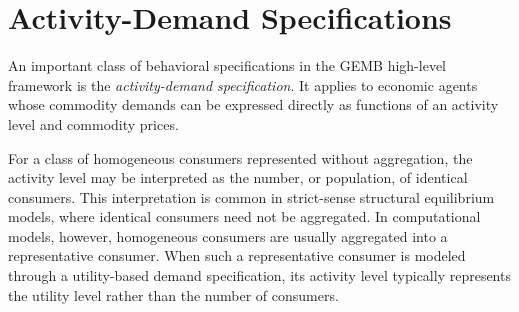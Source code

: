 \documentclass[
  letterpaper,
  DIV=11,
  numbers=noendperiod]{scrreprt}
\newenvironment{Shaded}{\begin{snugshade}}{\end{snugshade}}
\newcommand{\FloatTok}[1]{\textcolor[rgb]{0.68,0.00,0.00}{#1}}
\newcommand{\FunctionTok}[1]{\textcolor[rgb]{0.28,0.35,0.67}{#1}}
\newcommand{\NormalTok}[1]{\textcolor[rgb]{0.00,0.23,0.31}{#1}}
\newcommand{\OperatorTok}[1]{\textcolor[rgb]{0.37,0.37,0.37}{#1}}
\newcommand{\PreprocessorTok}[1]{\textcolor[rgb]{0.68,0.00,0.00}{#1}}
\newcommand{\StringTok}[1]{\textcolor[rgb]{0.13,0.47,0.30}{#1}}
\begin{document}
%

\section{Activity-Demand
Specifications}\label{activity-demand-specifications}

An important class of behavioral specifications in the GEMB high-level
framework is the \emph{activity-demand specification}. It applies to
economic agents whose commodity demands can be expressed directly as
functions of an activity level and commodity prices.

For a class of homogeneous consumers represented without aggregation,
the activity level may be interpreted as the number, or population, of
identical consumers. This interpretation is common in strict-sense
structural equilibrium models, where identical consumers need not be
aggregated. In computational models, however, homogeneous consumers are
usually aggregated into a representative consumer. When such a
representative consumer is modeled through a utility-based demand
specification, its activity level typically represents the utility level
rather than the number of consumers.
\end{document}
